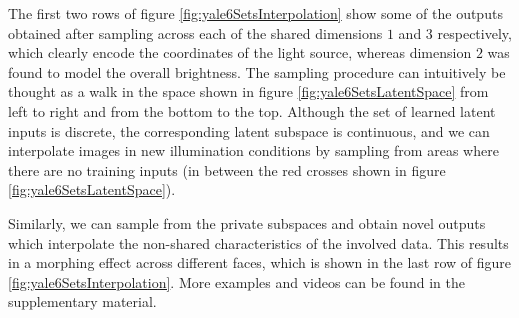 The first two rows of figure \ref{fig:yale6SetsInterpolation} show some of the outputs obtained after sampling across each of the shared dimensions $1$ and $3$ respectively, which clearly encode the coordinates of the light source,
whereas dimension $2$ was found to model the overall brightness. The sampling procedure can intuitively be thought as a walk in the space shown in figure \ref{fig:yale6SetsLatentSpace} from left to right and from the bottom to the top. Although the set of learned latent inputs is discrete, the corresponding latent subspace is continuous,
and we can interpolate images in new illumination conditions by sampling from areas where there are no training inputs (\ie in between the red crosses shown in figure \ref{fig:yale6SetsLatentSpace}).


Similarly, we can sample from the private subspaces and obtain novel outputs which interpolate the non-shared characteristics of the involved data. 
This results in a morphing effect across different faces, which is shown in the last row of figure \ref{fig:yale6SetsInterpolation}.
More examples and videos can be found in the supplementary material.


